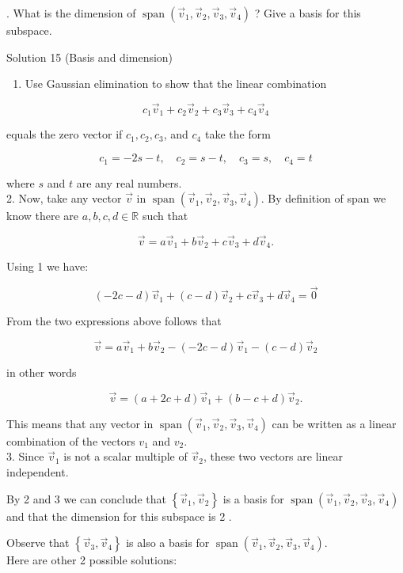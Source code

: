 \documentclass[10pt]{article}
\begin{document}
. What is the dimension of $\operatorname{span}\left(\vec{v}_{1}, \vec{v}_{2}, \vec{v}_{3}, \vec{v}_{4}\right)$ ? Give a basis for this subspace.

Solution 15 (Basis and dimension)

\begin{enumerate}
  \item Use Gaussian elimination to show that the linear combination
\end{enumerate}

$$
c_{1} \vec{v}_{1}+c_{2} \vec{v}_{2}+c_{3} \vec{v}_{3}+c_{4} \vec{v}_{4}
$$

equals the zero vector if $c_{1}, c_{2}, c_{3}$, and $c_{4}$ take the form

$$
c_{1}=-2 s-t, \quad c_{2}=s-t, \quad c_{3}=s, \quad c_{4}=t
$$

where $s$ and $t$ are any real numbers.\\
2. Now, take any vector $\vec{v}$ in $\operatorname{span}\left(\vec{v}_{1}, \vec{v}_{2}, \vec{v}_{3}, \vec{v}_{4}\right)$. By definition of span we know there are $a, b, c, d \in \mathbb{R}$ such that

$$
\vec{v}=a \vec{v}_{1}+b \vec{v}_{2}+c \vec{v}_{3}+d \vec{v}_{4} .
$$

Using 1 we have:

$$
(-2 c-d) \vec{v}_{1}+(c-d) \vec{v}_{2}+c \vec{v}_{3}+d \vec{v}_{4}=\overrightarrow{0}
$$

From the two expressions above follows that

$$
\vec{v}=a \vec{v}_{1}+b \vec{v}_{2}-(-2 c-d) \vec{v}_{1}-(c-d) \vec{v}_{2}
$$

in other words

$$
\vec{v}=(a+2 c+d) \vec{v}_{1}+(b-c+d) \vec{v}_{2} .
$$

This means that any vector in $\operatorname{span}\left(\vec{v}_{1}, \vec{v}_{2}, \vec{v}_{3}, \vec{v}_{4}\right)$ can be written as a linear combination of the vectors $v_{1}$ and $v_{2}$.\\
3. Since $\vec{v}_{1}$ is not a scalar multiple of $\vec{v}_{2}$, these two vectors are linear independent.

By 2 and 3 we can conclude that $\left\{\vec{v}_{1}, \vec{v}_{2}\right\}$ is a basis for $\operatorname{span}\left(\vec{v}_{1}, \vec{v}_{2}, \vec{v}_{3}, \vec{v}_{4}\right)$ and that the dimension for this subspace is 2 .

Observe that $\left\{\vec{v}_{3}, \vec{v}_{4}\right\}$ is also a basis for $\operatorname{span}\left(\vec{v}_{1}, \vec{v}_{2}, \vec{v}_{3}, \vec{v}_{4}\right)$.\\
Here are other 2 possible solutions:
\end{document}

